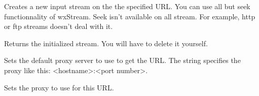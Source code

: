 %
%


Creates a new input stream on the the specified URL. You can use all but seek
functionnality of wxStream. Seek isn't available on all stream. For example,
http or ftp streams doesn't deal with it.


Returns the initialized stream. You will have to delete it yourself.



%
%
\label{wxurlsetdefaultproxy}


Sets the default proxy server to use to get the URL. The string specifies
the proxy like this: <hostname>:<port number>.





%
%
\label{wxurlsetproxy}


Sets the proxy to use for this URL.



